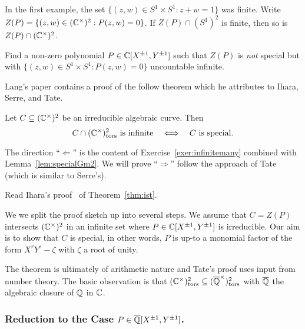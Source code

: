 In the first example, the set $\{(z,w) \in S^1\times S^1 : z+w=1\}$
was finite. Write $Z(P) = \{(z,w) \in ({\mathbb{C}}^\times)^2 : P(z,w)=0\}$. If
$Z(P)\cap (S^1)^2$ is finite, then so is $Z(P) \cap ({\mathbb{C}}^\times)^2$.

\begin{exercise}
  \label{exer:toralpoly}
  Find a non-zero polynomial $P\in {\mathbb{C}}[X^{\pm 1},Y^{\pm 1}]$ such that
  $Z(P)$ is \emph{not} special but with $\{(z,w)\in S^1 \times S^1 :
  P(z,w)=0\}$ uncountable infinite.  
\end{exercise}

Lang's paper contains a proof of the follow theorem which he
attributes to Ihara, Serre, and Tate.

\begin{theorem}
  \label{thm:ist}
  Let $C\subseteq ({\mathbb{C}}^\times)^2$ be an irreducible algebraic curve.
  Then
  \begin{equation*}
    C \cap ({\mathbb{C}}^\times)^2_{\mathrm{tors}}\text{ is infinite}\quad\Longleftrightarrow\quad \text{$C$ is special}. 
  \end{equation*}
\end{theorem}

The direction ``$\Longleftarrow$'' is the content of
Exercise~\ref{exer:infinitemany} combined with
Lemma~\ref{lem:specialGm2}. We will prove ``$\Longrightarrow$'' follow
the approach of Tate (which is similar to Serre's).

\begin{exercise}
  Read Ihara's proof~\cite{Lang:Division} of Theorem~\ref{thm:ist}.
\end{exercise}

We we split the proof sketch up into several steps. We assume that
$C=Z(P)$ intersects $({\mathbb{C}}^\times)^2$ in an infinite set where $P\in
{\mathbb{C}}[X^{\pm 1},Y^{\pm 1}]$ is irreducible.
Our aim is to show that $C$ is special, in other words, $P$ is up-to a
monomial factor of the form $X^rY^s-\zeta$ with $\zeta$ a root of
unity. 

The theorem is ultimately of arithmetic nature and Tate's proof uses
input from number theory. The basic observation is that
$({\mathbb{C}}^\times)^2_{\mathrm{tors}}\subseteq
({\overline{\mathbb{Q}}}^\times)^2_{\mathrm{tors}}$ with ${\overline{\mathbb{Q}}}$ the algebraic closure
of ${\mathbb{Q}}$ in ${\mathbb{C}}$.

\subsubsection{Reduction to the Case $P \in {\overline{\mathbb{Q}}}[X^{\pm
    1},Y^{\pm 1}]$.}

